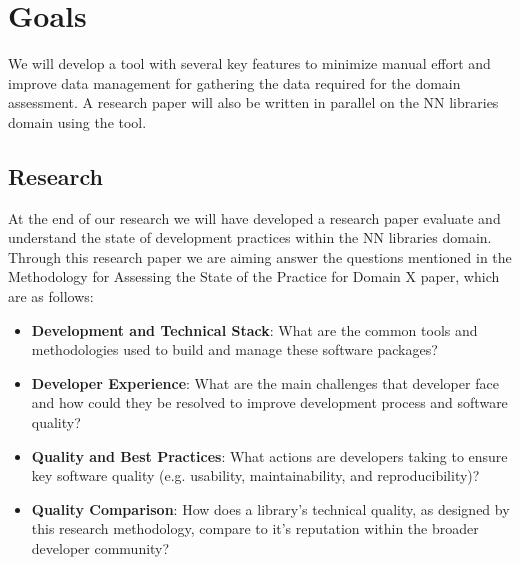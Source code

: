 \documentclass{article}
\begin{document}
\section{Goals}
We will develop a tool with several key features to minimize manual effort and improve data management for gathering the data required for the domain assessment.
A research paper will also be written in parallel on the NN libraries domain using the tool.
\subsection{Research}\label{research_paper}
At the end of our research we will have developed a research paper evaluate and understand the state of development practices within the NN libraries domain. Through this research paper we are aiming answer the questions mentioned in the Methodology for Assessing the State of the Practice for Domain X paper, which are as follows:
\begin{itemize}
    \item \textbf{Development and Technical Stack}: What are the common tools and methodologies used to build and manage these software packages?
    \item \textbf{Developer Experience}: What are the main challenges that developer face and how could they be resolved to improve development process and software quality?
    \item \textbf{Quality and Best Practices}: What actions are developers taking to ensure key software quality (e.g. usability, maintainability, and reproducibility)?
    \item \textbf{Quality Comparison}: How does a library's technical quality, as designed by this research methodology, compare to it's reputation within the broader developer community?
\end{itemize}
\end{document}
